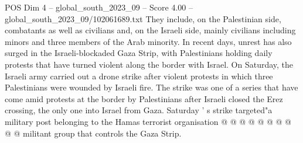 \begin{textsample}{POS Dim 4 – global\_south\_2023\_09 – Score 4.00 – global\_south\_2023\_09/102061689.txt}
They include, on the Palestinian side, combatants as well as civilians and, on the Israeli side, mainly civilians including minors and three members of the Arab minority.
In recent days, unrest has also surged in the Israeli-blockaded Gaza Strip, with Palestinians holding daily protests that have turned violent along the border with Israel.
On Saturday, the Israeli army carried out a drone strike after violent protests in which three Palestinians were wounded by Israeli fire.
The strike was one of a series that have come amid protests at the border by Palestinians after Israeli closed the Erez crossing, the only one into Israel from Gaza.
Saturday ' s strike targeted"a military post belonging to the Hamas terrorist organisation @ @ @ @ @ @ @ @ @ @ militant group that controls the Gaza Strip.

\end{textsample}
